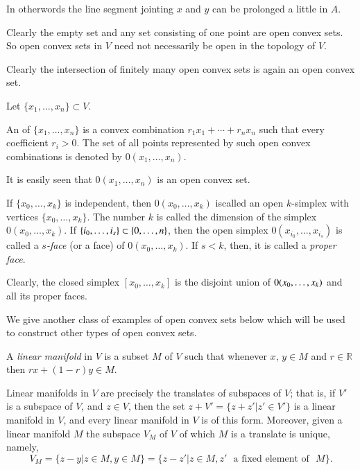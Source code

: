 In otherwords the line segment jointing $x$ and $y$ can be prolonged a little in $A$.

Clearly the empty set and any set consisting of one point are open convex sets. So open convex sets in $V$ need not necessarily be open in the topology of $V$.

Clearly the intersection of finitely many open convex sets is again an open convex set.

\begin{definition}\label{chap1-defi1.3.2}
Let $\{x_{1},\ldots,x_{n}\}\subset V$.
\end{definition}

An of $\{x_{1},\ldots,x_{n}\}$ is a convex combination $r_{1}x_{1}+\cdots+r_{n}x_{n}$ such that every coefficient $r_{i}>0$. The set of all points represented by such open convex combinations is denoted by $0(x_{1},\ldots,x_{n})$.

It is easily seen that $0(x_{1},\ldots,x_{n})$ is an open convex set. 

\begin{definition}\label{chap1-defi1.3.3}
If $\{x_{0},\ldots,x_{k}\}$ is independent, then $0(x_{0},\ldots,x_{k})$ is\break called an open $k$-simplex with vertices $\{x_{0},\ldots,x_{k}\}$. The number $k$ is called the dimension of the simplex $0(x_{0},\ldots,x_{k})$. If $\{i_{0},\ldots,i_{s}\}\subset\break \{0,\ldots,n\}$, then the open simplex $0(x_{i_{0}},\ldots,x_{i_{s}})$ is called a {\em $s$-face} (or a face) of $0(x_{0},\ldots,x_{k})$. If $s<k$, then, it is called a {\em proper face}.
\end{definition}

Clearly, the closed simplex $[x_{0},\ldots,x_{k}]$ is the disjoint union of $0(x_{0},\break\ldots,x_{k})$ and all its proper faces.

We give another class of examples of open convex sets below which will be used to construct other types of open convex sets.

\begin{definition}\label{chap1-defi1.3.4}
A {\em linear manifold} in $V$ is a subset $M$ of $V$ such that whenever $x$, $y\in M$ and $r\in\mathbb{R}$ then $rx+(1-r)y\in M$.
\end{definition}

Linear manifolds in $V$ are precisely the translates of subspaces of $V$; that is, if $V'$ is a subspace of $V$, and $z\in V$, then the set $z+V'=\{z+z'|z'\in V'\}$ is a linear manifold in $V$, and every linear manifold in $V$ is of this form. Moreover, given a linear manifold $M$ the subspace $V_{M}$ of $V$ of which $M$ is a translate is unique, namely,
$$
V_{M}=\{z-y|z\in M, y\in M\}=\{z-z'|z\in M,z'\text{~ a fixed element of~ } M\}. 
$$\pageoriginale

